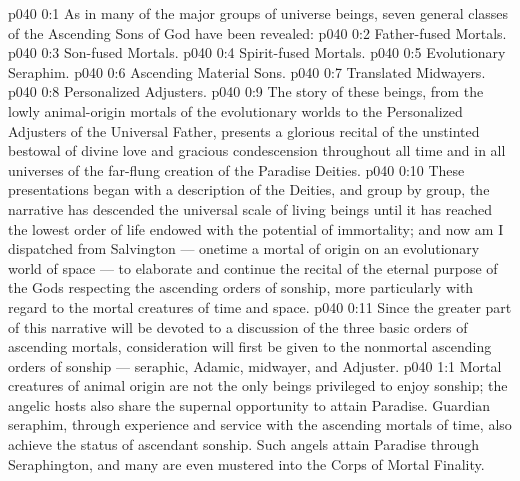 \author{Mighty Messenger}
\vs p040 0:1 As in many of the major groups of universe beings, seven general classes of the Ascending Sons of God have been revealed:
\vs p040 0:2 \bibnobreakspace Father\hyp{}fused Mortals.
\vs p040 0:3 \bibnobreakspace Son\hyp{}fused Mortals.
\vs p040 0:4 \bibnobreakspace Spirit\hyp{}fused Mortals.
\vs p040 0:5 \bibnobreakspace Evolutionary Seraphim.
\vs p040 0:6 \bibnobreakspace Ascending Material Sons.
\vs p040 0:7 \bibnobreakspace Translated Midwayers.
\vs p040 0:8 \bibnobreakspace Personalized Adjusters.
\vs p040 0:9 \pc The story of these beings, from the lowly animal\hyp{}origin mortals of the evolutionary worlds to the Personalized Adjusters of the Universal Father, presents a glorious recital of the unstinted bestowal of divine love and gracious condescension throughout all time and in all universes of the far\hyp{}flung creation of the Paradise Deities.
\vs p040 0:10 These presentations began with a description of the Deities, and group by group, the narrative has descended the universal scale of living beings until it has reached the lowest order of life endowed with the potential of immortality; and now am I dispatched from Salvington --- onetime a mortal of origin on an evolutionary world of space --- to elaborate and continue the recital of the eternal purpose of the Gods respecting the ascending orders of sonship, more particularly with regard to the mortal creatures of time and space.
\vs p040 0:11 Since the greater part of this narrative will be devoted to a discussion of the three basic orders of ascending mortals, consideration will first be given to the nonmortal ascending orders of sonship --- seraphic, Adamic, midwayer, and Adjuster.
\vs p040 1:1 Mortal creatures of animal origin are not the only beings privileged to enjoy sonship; the angelic hosts also share the supernal opportunity to attain Paradise. Guardian seraphim, through experience and service with the ascending mortals of time, also achieve the status of ascendant sonship. Such angels attain Paradise through Seraphington, and many are even mustered into the Corps of Mortal Finality.
